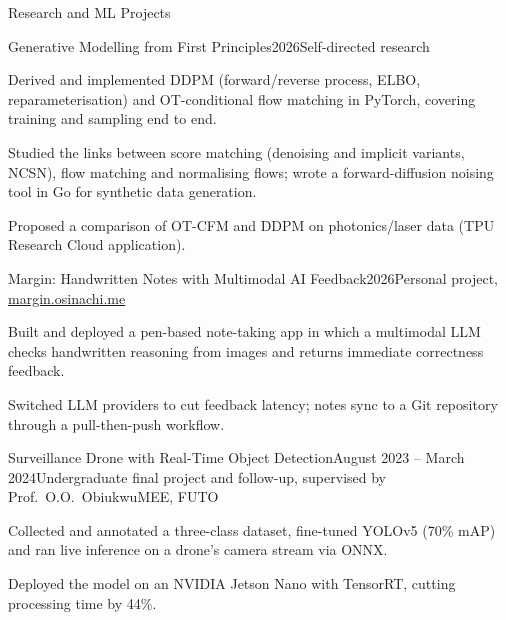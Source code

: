 \documentclass{resume}
\begin{document}
\begin{rSection}{Research and ML Projects}

\begin{rSubsection}{Generative Modelling from First Principles}{2026}{Self-directed research}{}
\item Derived and implemented DDPM (forward/reverse process, ELBO, reparameterisation) and OT-conditional flow matching in PyTorch, covering training and sampling end to end.
\item Studied the links between score matching (denoising and implicit variants, NCSN), flow matching and normalising flows; wrote a forward-diffusion noising tool in Go for synthetic data generation.
\item Proposed a comparison of OT-CFM and DDPM on photonics/laser data (TPU Research Cloud application).
\end{rSubsection}

\begin{rSubsection}{Margin: Handwritten Notes with Multimodal AI Feedback}{2026}{Personal project, \href{https://margin.osinachi.me}{margin.osinachi.me}}{}
\item Built and deployed a pen-based note-taking app in which a multimodal LLM checks handwritten reasoning from images and returns immediate correctness feedback.
\item Switched LLM providers to cut feedback latency; notes sync to a Git repository through a pull-then-push workflow.
\end{rSubsection}

\begin{rSubsection}{Surveillance Drone with Real-Time Object Detection}{August 2023 -- March 2024}{Undergraduate final project and follow-up, supervised by Prof.\ O.O.\ Obiukwu}{MEE, FUTO}
\item Collected and annotated a three-class dataset, fine-tuned YOLOv5 (70\% mAP) and ran live inference on a drone's camera stream via ONNX.
\item Deployed the model on an NVIDIA Jetson Nano with TensorRT, cutting processing time by 44\%.
\end{rSubsection}

\end{rSection}
\end{document}
